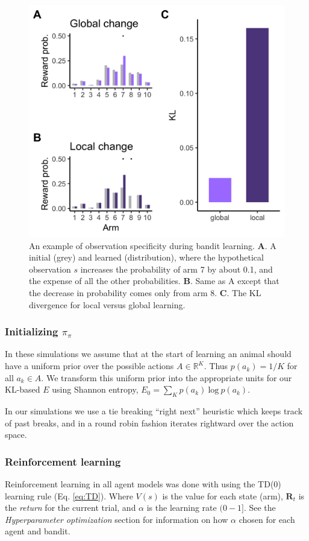 \begin{figure}
	[tbhp] \centering 
	\includegraphics[width=.95\linewidth]{figures/subfig2.png} 
	\caption{\label{fig:supf2} An example of observation specificity during bandit learning. 
	\textbf{A}. A initial (grey) and learned (distribution), where the hypothetical observation $s$ increases the probability of arm 7 by about 0.1, and the expense of all the other probabilities.
	\textbf{B}. Same as A except that the decrease in probability comes only from arm 8.
	\textbf{C}. The KL divergence for local versus global learning.
	}
\end{figure}

\subsubsection*{Initializing $\pi_\pi$}
In these simulations we assume that at the start of learning an animal should have a uniform prior over the possible actions $A \in \mathbb{R}^K$. Thus $p(a_k) = 1/K$ for all $a_k \in A$. We transform this uniform prior into the appropriate units for our KL-based $E$ using Shannon entropy, $E_0 = \sum_K p(a_k)\ \text{log}\ p(a_k)$. 

In our simulations we use a tie breaking ``right next'' heuristic which keeps track of past breaks, and in a round robin fashion iterates rightward over the action space.

\subsubsection*{Reinforcement learning} Reinforcement learning in all agent models was done with using the TD(0) learning rule \cite{Sutton2018} (Eq. \ref{eq:TD}). Where $V(s)$ is the value for each state (arm), $\mathbf{R}_t$ is the \emph{return} for the current trial, and $\alpha$ is the learning rate $(0-1]$. See the \emph{Hyperparameter optimization} section for information on how $\alpha$ chosen for each agent and bandit.

